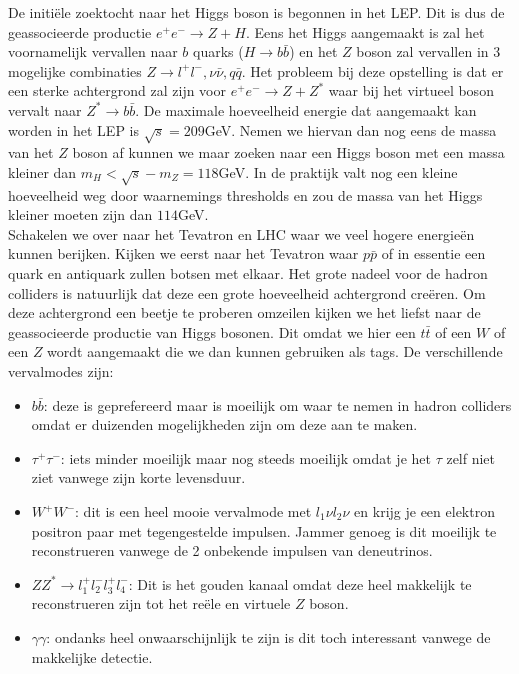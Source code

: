 \documentclass[../main.tex]{subfiles}
\begin{document}
De initiële zoektocht naar het Higgs boson is begonnen in het LEP. Dit is dus de geassocieerde productie $e^{+} e^{-} \rightarrow Z+H$. Eens het Higgs aangemaakt is zal het voornamelijk vervallen naar $b$ quarks ($H \rightarrow b \bar{b}$) en het $Z$ boson zal vervallen in 3 mogelijke combinaties $Z \rightarrow l^{+} l^{-}, \nu \bar{\nu}, q \bar{q}$. Het probleem bij deze opstelling is dat er een sterke achtergrond zal zijn voor $e^{+} e^{-} \rightarrow Z+Z^{*}$ waar bij het virtueel boson vervalt naar $Z^{*} \rightarrow b \bar{b}$. De maximale hoeveelheid energie dat aangemaakt kan worden in het LEP is $\sqrt{s} = 209$GeV. Nemen we hiervan dan nog eens de massa van het $Z$ boson af kunnen we maar zoeken naar een Higgs boson met een massa kleiner dan $m_{H}<\sqrt{s}-m_{Z}=118$GeV. In de praktijk valt nog een kleine hoeveelheid weg door waarnemings thresholds en zou de massa van het Higgs kleiner moeten zijn dan $114$GeV.\\
Schakelen we over naar het Tevatron en LHC waar we veel hogere energieën kunnen berijken. Kijken we eerst naar het Tevatron waar $p\bar{p}$ of in essentie een quark en antiquark zullen botsen met elkaar. Het grote nadeel voor de hadron colliders is natuurlijk dat deze een grote hoeveelheid achtergrond creëren. Om deze achtergrond een beetje te proberen omzeilen kijken we het liefst naar de geassocieerde productie van Higgs bosonen. Dit omdat we hier een $t\bar{t}$ of een $W$ of een $Z$ wordt aangemaakt die we dan kunnen gebruiken als tags. De verschillende vervalmodes zijn:
\begin{itemize}
    \item $b\bar{b}$: deze is geprefereerd maar is moeilijk om waar te nemen in hadron colliders omdat er duizenden mogelijkheden zijn om deze aan te maken.
    \item $\tau^{+} \tau^{-}$: iets minder moeilijk maar nog steeds moeilijk omdat je het $\tau$ zelf niet ziet vanwege zijn korte levensduur.
    \item $W^+W^-$: dit is een heel mooie vervalmode met $l_{1} \nu l_{2} \nu$ en krijg je een elektron positron paar met tegengestelde impulsen. Jammer genoeg is dit moeilijk te reconstrueren vanwege de 2 onbekende impulsen van deneutrinos.
    \item $Z Z^{*} \rightarrow l_{1}^{+} l_{2}^{-} l_{3}^{+} l_{4}^{-}$: Dit is het gouden kanaal omdat deze heel makkelijk te reconstrueren zijn tot het reële en virtuele $Z$ boson.
    \item $\gamma\gamma$: ondanks heel onwaarschijnlijk te zijn is dit toch interessant vanwege de makkelijke detectie.
\end{itemize}
\end{document}

